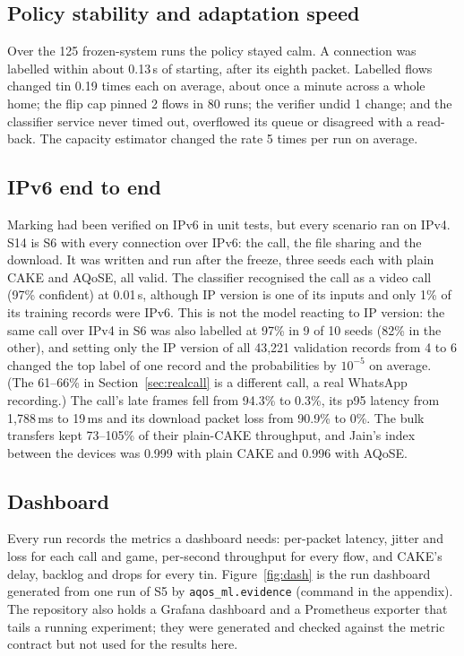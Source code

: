 \documentclass[11pt,a4paper]{article}
\begin{document}
\subsection{Policy stability and adaptation speed}
Over the 125 frozen-system runs the policy stayed calm. A connection was labelled within about 0.13\,s of starting, after its eighth packet. Labelled flows changed tin 0.19 times each on average, about once a minute across a whole home; the flip cap pinned 2 flows in 80 runs; the verifier undid 1 change; and the classifier service never timed out, overflowed its queue or disagreed with a read-back. The capacity estimator changed the rate 5 times per run on average.

\subsection{IPv6 end to end}
Marking had been verified on IPv6 in unit tests, but every scenario ran on IPv4. S14 is S6 with every connection over IPv6: the call, the file sharing and the download. It was written and run after the freeze, three seeds each with plain CAKE and AQoSE, all valid. The classifier recognised the call as a video call (97\% confident) at 0.01\,s, although IP version is one of its inputs and only 1\% of its training records were IPv6. This is not the model reacting to IP version: the same call over IPv4 in S6 was also labelled at 97\% in 9 of 10 seeds (82\% in the other), and setting only the IP version of all 43,221 validation records from 4 to 6 changed the top label of one record and the probabilities by $10^{-5}$ on average. (The 61--66\% in Section~\ref{sec:realcall} is a different call, a real WhatsApp recording.) The call's late frames fell from 94.3\% to 0.3\%, its p95 latency from 1,788\,ms to 19\,ms and its download packet loss from 90.9\% to 0\%. The bulk transfers kept 73--105\% of their plain-CAKE throughput, and Jain's index between the devices was 0.999 with plain CAKE and 0.996 with AQoSE.

\subsection{Dashboard}
Every run records the metrics a dashboard needs: per-packet latency, jitter and loss for each call and game, per-second throughput for every flow, and CAKE's delay, backlog and drops for every tin. Figure~\ref{fig:dash} is the run dashboard generated from one run of S5 by \texttt{aqos\_ml.evidence} (command in the appendix). The repository also holds a Grafana dashboard and a Prometheus exporter that tails a running experiment; they were generated and checked against the metric contract but not used for the results here.
\end{document}

